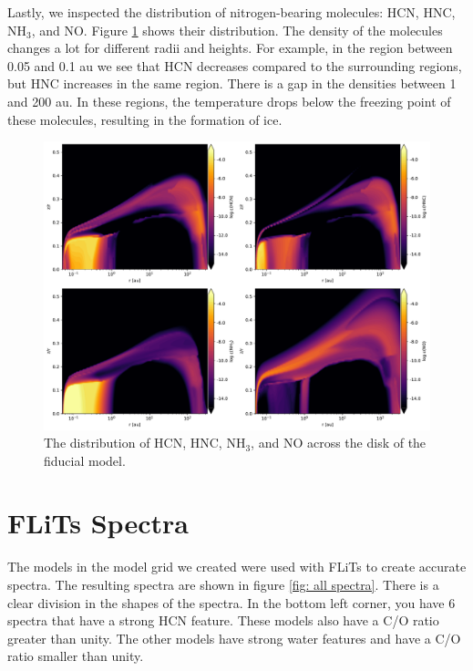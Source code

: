 \documentclass[oneside, single, authoryear, semicolon]{lion-msc}
\newcommand{\4}{$_4$}
\newcommand{\3}{$_3$}
\newcommand{\2}{$_2$}
\begin{document}
Lastly, we inspected the distribution of nitrogen-bearing molecules: HCN, HNC, NH\3, and NO. Figure \ref{fig: nitrogen distribution} shows their distribution. The density of the molecules changes a lot for different radii and heights. For example, in the region between 0.05 and 0.1 au we see that HCN decreases compared to the surrounding regions, but HNC increases in the same region. There is a gap in the densities between 1 and 200 au. In these regions, the temperature drops below the freezing point of these molecules, resulting in the formation of ice. 

\begin{figure}[!ht]
    \centering
    \includegraphics[width=.8\linewidth]{Figures/Abundance.pdf}
    \caption{The distribution of HCN, HNC, NH\3, and NO across the disk of the fiducial model.}
    \label{fig: nitrogen distribution}
\end{figure}

\section{FLiTs Spectra}
The models in the model grid we created were used with FLiTs to create accurate spectra. The resulting spectra are shown in figure \ref{fig: all spectra}. There is a clear division in the shapes of the spectra. In the bottom left corner, you have 6 spectra that have a strong HCN feature. These models also have a C/O ratio greater than unity. The other models have strong water features and have a C/O ratio smaller than unity. 
\end{document}
